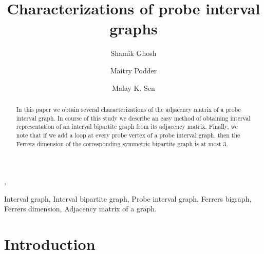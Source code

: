 \documentclass[secthm]{elsart}
\begin{document}
\pagestyle{headings}

\begin{frontmatter}

\title{Characterizations of probe interval graphs}

\author{Shamik Ghosh}
,
\author{Maitry Podder}

\address{Department of Mathematics, Jadavpur University, Kolkata - 700 032, India.}

\author{Malay K. Sen}

\address{Department of Mathematics, North Bengal University,
   Darjeeling, West Bengal, India, Pin - 734 430.}



\begin{abstract}
In this paper we obtain several characterizations of the adjacency matrix of a probe interval graph. In course of this study we describe an easy method of obtaining interval representation of an interval bipartite graph from its adjacency matrix. Finally, we note that if we add a loop at every probe vertex of a probe interval graph, then the Ferrers dimension of the corresponding symmetric bipartite graph is at most $3$. 
\end{abstract}

\begin{keyword}
Interval graph, Interval bipartite graph, Probe interval graph, Ferrers bigraph, Ferrers dimension, Adjacency matrix of a graph.
\end{keyword}

\end{frontmatter}

\section{Introduction}
\end{document}
